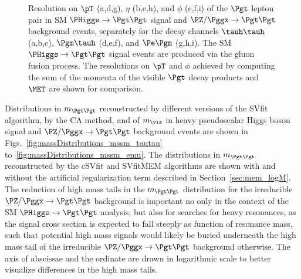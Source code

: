 \begin{figure}
\begin{center}
\end{center}
\caption{
  Resolution on $\pT$ (a,d,g), $\eta$ (b,e,h), and $\phi$ (c,f,i) of the $\Pgt$ lepton
  pair in SM $\PHiggs \to \Pgt\Pgt$ signal and $\PZ/\Pggx \to
  \Pgt\Pgt$ background events,
  separately for the decay channels $\tauh\tauh$ (a,b,c), $\Pgm\tauh$ (d,e,f),
  and $\Pe\Pgm$ (g,h,i).
  The SM $\PHiggs \to \Pgt\Pgt$ signal events are produced via the
  gluon fusion process.
  The resolutions on $\pT$ and $\phi$ achieved by computing the sum of
  the momenta of the visible $\Pgt$ decay products and $\MET$ are shown for comparison.
}
\label{fig:resolutions_sm_pT_eta_and_phi}
\end{figure}

Distributions in $m_{\Pgt\Pgt}$ reconstructed by different versions of
the SVfit algorithm, by the CA method, and of $m_{\vis}$ in heavy
pseudoscalar Higgs boson signal and $\PZ/\Pggx \to \Pgt\Pgt$
background events are shown in
Figs.~\ref{fig:massDistributions_mssm_tautau}
to~\ref{fig:massDistributions_mssm_emu}.
The distributions in $m_{\Pgt\Pgt}$ reconstructed by the cSVfit and
SVfitMEM algorithms are shown with and without the artificial regularization
term described in Section~\ref{sec:mem_logM}. 
The reduction of high mass tails in the $m_{\Pgt\Pgt}$ distribution
for the irreducible $\PZ/\Pggx \to \Pgt\Pgt$
background is important no only in the context of the SM $\PHiggs \to
\Pgt\Pgt$ analysis, but also for searches for heavy resonances, as the signal cross section is expected to fall steeply as function of resonance mass,
such that potential high mass signals would likely be buried underneath the high mass tail of the irreducible $\PZ/\Pggx \to \Pgt\Pgt$ background otherwise.
The axis of abscissae and the ordinate are drawn in logarithmic scale to better visualize differences in the high mass tails.

